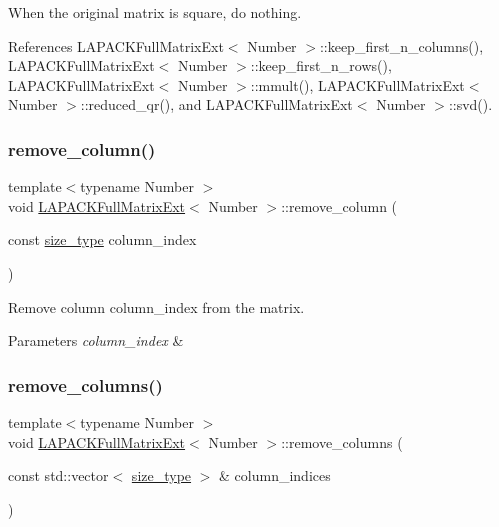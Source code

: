 When the original matrix is square, do nothing.

References L\+A\+P\+A\+C\+K\+Full\+Matrix\+Ext$<$ Number $>$\+::keep\+\_\+first\+\_\+n\+\_\+columns(), L\+A\+P\+A\+C\+K\+Full\+Matrix\+Ext$<$ Number $>$\+::keep\+\_\+first\+\_\+n\+\_\+rows(), L\+A\+P\+A\+C\+K\+Full\+Matrix\+Ext$<$ Number $>$\+::mmult(), L\+A\+P\+A\+C\+K\+Full\+Matrix\+Ext$<$ Number $>$\+::reduced\+\_\+qr(), and L\+A\+P\+A\+C\+K\+Full\+Matrix\+Ext$<$ Number $>$\+::svd().

\mbox{\label{classLAPACKFullMatrixExt_a4b4bb2b69261608f54c42f329d272195}} 
\subsubsection{\texorpdfstring{remove\+\_\+column()}{remove\_column()}}
{\footnotesize\ttfamily template$<$typename Number $>$ \\
void \hyperlink{classLAPACKFullMatrixExt}{L\+A\+P\+A\+C\+K\+Full\+Matrix\+Ext}$<$ Number $>$\+::remove\+\_\+column (\begin{DoxyParamCaption}\item[{const \hyperlink{classLAPACKFullMatrixExt_a5cf5f4a6104dc17029210b5ca52bf574}{size\+\_\+type}}]{column\+\_\+index }\end{DoxyParamCaption})}

Remove column {\ttfamily column\+\_\+index} from the matrix. 
\begin{DoxyParams}{Parameters}
{\em column\+\_\+index} & \\
\hline
\end{DoxyParams}
\mbox{\label{classLAPACKFullMatrixExt_acf4f82469289156a7d3993def0481152}} 
\subsubsection{\texorpdfstring{remove\+\_\+columns()}{remove\_columns()}}
{\footnotesize\ttfamily template$<$typename Number $>$ \\
void \hyperlink{classLAPACKFullMatrixExt}{L\+A\+P\+A\+C\+K\+Full\+Matrix\+Ext}$<$ Number $>$\+::remove\+\_\+columns (\begin{DoxyParamCaption}\item[{const std\+::vector$<$ \hyperlink{classLAPACKFullMatrixExt_a5cf5f4a6104dc17029210b5ca52bf574}{size\+\_\+type} $>$ \&}]{column\+\_\+indices }\end{DoxyParamCaption})}

